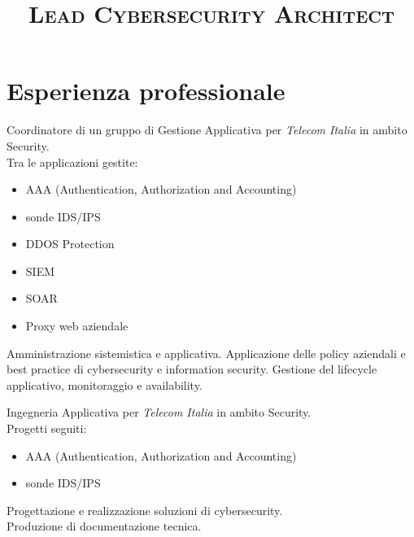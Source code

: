 \documentclass[a4paper, 11pt]{moderncv}
\title{\Large{\textsc{Lead Cybersecurity \break Architect}}}
\begin{document}
\makecvtitle

\section{Esperienza professionale}
        {Coordinatore di un gruppo di Gestione Applicativa per \emph{Telecom Italia} in ambito Security.\\ Tra le applicazioni gestite: \begin{itemize}
          \item AAA (Authentication, Authorization and Accounting)
          \item sonde IDS/IPS
          \item DDOS Protection
          \item SIEM
          \item SOAR
          \item Proxy web aziendale
          \end{itemize}
          Amministrazione sistemistica e applicativa. Applicazione delle policy aziendali e best practice di cybersecurity e information security. Gestione del lifecycle applicativo, monitoraggio e availability.}
\vspace{3mm}
        {Ingegneria Applicativa per \emph{Telecom Italia} in ambito Security. \\ Progetti seguiti:
          \begin{itemize}
          \item AAA (Authentication, Authorization and Accounting)
          \item sonde IDS/IPS
        \end{itemize}
          Progettazione e realizzazione soluzioni di cybersecurity.\\
          Produzione di documentazione tecnica.}
\vspace{3mm}
\end{document}
